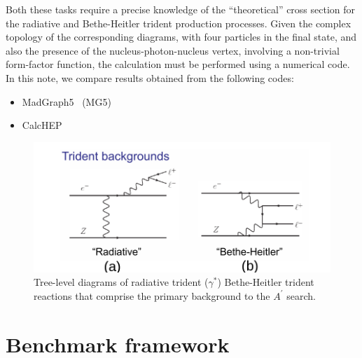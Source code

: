 \documentclass{article}
\begin{document}
Both these tasks require a precise knowledge of the ``theoretical'' cross section for the radiative and Bethe-Heitler trident production processes. Given the complex topology of the corresponding diagrams, with four particles in the final state, and also the presence of the nucleus-photon-nucleus vertex, involving a non-trivial form-factor function, the calculation must be performed using a numerical code. In this note, we compare results obtained from the following codes:
\begin{itemize}
\item  MadGraph5~\cite{Alwall:2011uj} (MG5) 
\item CalcHEP~\cite{Belyaev:2012qa}
\end{itemize}

\begin{figure}[tpb]
\centering
\includegraphics[width=.7\textwidth]{img/diagrams.png}
\caption{\label{fig:diagrams} Tree-level diagrams of radiative trident ($\gamma^*$) Bethe-Heitler trident reactions that comprise the primary background to the $A^\prime$ search.}
\end{figure}

\section{Benchmark framework}
\end{document}

